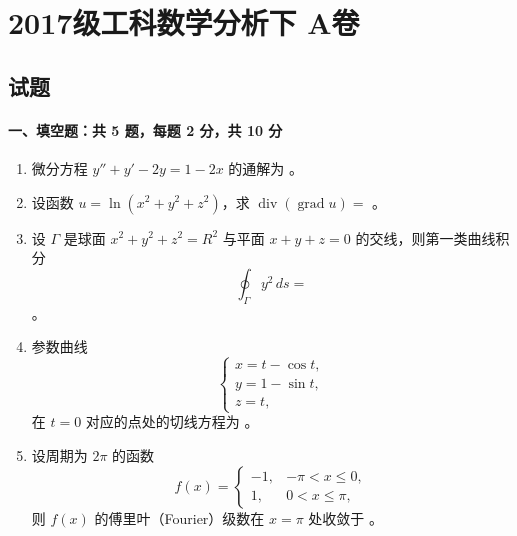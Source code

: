 \section{2017级工科数学分析下 A卷}

\subsection{试题}

\paragraph*{一、填空题：共 5 题，每题 2 分，共 10 分}
\begin{enumerate}
  \item 微分方程 $y''+y'-2y=1-2x$ 的通解为 \underline{\hspace{5cm}}。

  \item 设函数 $u=\ln(x^2+y^2+z^2)$，求 $\operatorname{div}(\operatorname{grad}u)=$ \underline{\hspace{4cm}}。

  \item 设 $\Gamma$ 是球面 $x^2+y^2+z^2=R^2$ 与平面 $x+y+z=0$ 的交线，则第一类曲线积分
  \[
    \oint_{\Gamma} y^2\,ds=
  \]
  \underline{\hspace{4cm}}。

  \item 参数曲线
  \[
    \begin{cases}
      x=t-\cos t,\\
      y=1-\sin t,\\
      z=t,
    \end{cases}
  \]
  在 $t=0$ 对应的点处的切线方程为 \underline{\hspace{6cm}}。

  \item 设周期为 $2\pi$ 的函数
  \[
    f(x)=
    \begin{cases}
      -1, & -\pi<x\le 0,\\
      1, & 0<x\le \pi,
    \end{cases}
  \]
  则 $f(x)$ 的傅里叶（Fourier）级数在 $x=\pi$ 处收敛于 \underline{\hspace{4cm}}。
\end{enumerate}

